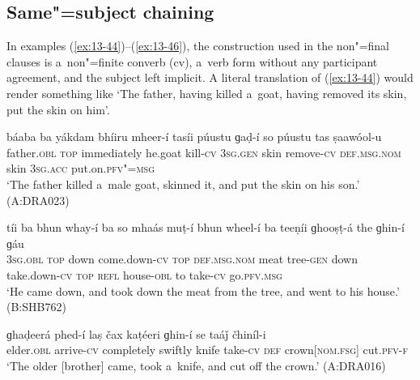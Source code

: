 \subsection{Same"=subject chaining}
\label{subsec:13-3-1}

In examples (\ref{ex:13-44})--(\ref{ex:13-46}), the construction used in the non"=final clauses is a~non"=finite converb (cv), a~verb form without any participant agreement, and the subject left implicit. A literal translation of (\ref{ex:13-44}) would render something like `The father, having killed a~goat, having removed its skin, put the skin on him'. 

\begin{exe}
\ex
\label{ex:13-44}
\gll \label{bkm:Ref190770484}{\ob}báaba ba yákdam bhíiru mheer-í{\cb} {\ob}tasíi púustu ɡaḍ-í{\cb} so púustu tas ṣaawóol-u  \\
father.\textsc{obl} \textsc{top} immediately he.goat kill-\textsc{cv} \textsc{3sg.gen} skin  remove-\textsc{cv} \textsc{def.msg.nom} skin \textsc{3sg.acc} put.on.\textsc{pfv"=msg} \\
\glt `The father killed a~male goat, skinned it, and put the skin on his son.' (A:DRA023)

\ex
\label{ex:13-45}
\gll tíi ba {\ob}bhun whay-í ba{\cb} {\ob}so  mhaás muṭ-í bhun wheel-í ba{\cb} {\ob}teeṇíi
  ɡhooṣṭ-á the ɡhin-í{\cb} ɡáu \\
\textsc{3sg.obl} \textsc{top} down come.down-\textsc{cv} \textsc{top} \textsc{def.msg.nom}  meat tree-\textsc{gen} down take.down-\textsc{cv} \textsc{top} \textsc{refl} house-\textsc{obl}  to take-\textsc{cv} go.\textsc{pfv.msg} \\
\glt `He came down, and took down the meat from the tree, and went to his house.' (B:SHB762)

\ex
\label{ex:13-46}
\gll ɡhaḍeerá {\ob}phed-í{\cb} {\ob}laṣ čax kaṭéeri ɡhin-í{\cb} se taáǰ čhiníl-i \\
elder.\textsc{obl} arrive-\textsc{cv} completely swiftly knife take-\textsc{cv}  \textsc{def} crown[\textsc{nom.fsg}] cut.\textsc{pfv-f}\\
\glt `The older [brother] came, took a~knife, and cut off the crown.' (A:DRA016) 
\end{exe}

